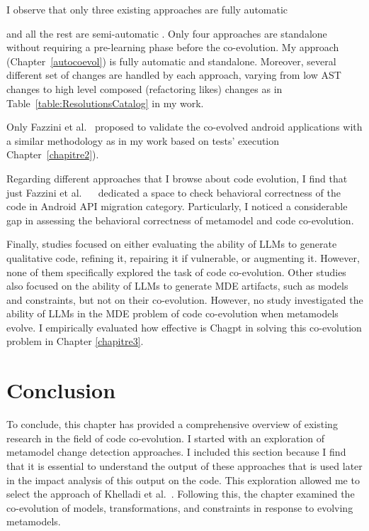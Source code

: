   I observe that only three existing approaches are fully automatic {\cite{10.1145/3387905.3388608,10.1145/3597503.3639084,8813263} and all the rest are semi-automatic \cite{9079197,10.5555/2486788.2486855,6062100,dagenais2011recommending,5070565,henkel2005catchup,10.1145/1932682.1869486,10.1145/3194793.3194798,Khelladi2020}. Only four approaches are standalone without requiring a pre-learning phase before the co-evolution.
   My approach (Chapter~\ref{autocoevol}) is fully automatic and standalone. Moreover, several different set of changes are handled by each approach, varying from low AST changes to high level composed (refactoring likes) changes as in Table~\ref{table:ResolutionsCatalog} in my work. 
   
    Only Fazzini et al.~\cite{10.1145/3387905.3388608} proposed to validate the co-evolved android applications with a similar methodology as in my work based on tests' execution Chapter~\ref{chapitre2}). 
  
 Regarding different approaches that I browse about code evolution, I find that just Fazzini et al.~ ~\cite{10.1145/3387905.3388608} dedicated a space to check behavioral correctness of the code in Android API migration category. Particularly, I noticed a considerable gap in assessing the behavioral correctness of metamodel and code co-evolution.
  
  Finally, studies focused on either evaluating the ability of LLMs to generate qualitative code, refining it, repairing it if vulnerable, or augmenting it. However, none of them specifically explored the task of code co-evolution.
  Other studies also focused on the ability of LLMs to generate MDE artifacts, such as models and constraints, but not on their co-evolution. However, no study investigated the ability of LLMs in the MDE problem of code co-evolution when metamodels evolve. I empirically evaluated how effective is Chagpt in solving this co-evolution problem in Chapter \ref{chapitre3}.
  
  \section{Conclusion}
  To conclude, this chapter has provided a comprehensive overview of existing research in the field of code co-evolution. I started with an exploration of metamodel change detection approaches. I included this section because I find that it is essential to understand the output of these approaches that is used later in the impact analysis of this output on the code. This exploration allowed me to select the approach of Khelladi et al.~\cite{khelladi2015detecting}. Following this, the chapter examined the co-evolution of models, transformations, and constraints in response to evolving metamodels.
  
}
